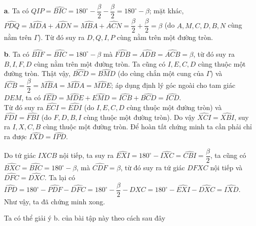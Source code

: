 \begin{ex}
{\noindent \textbf{a}. Ta có $\widehat{QIP}=\widehat{BIC}=180^\circ-\dfrac{\beta}{2}-\dfrac{\beta}{2}=180^\circ-\beta$; mặt khác, $\widehat{PDQ}=\widehat{MDA}+\widehat{ADN}=\widehat{MBA}+\widehat{ACN}=\dfrac{\beta}{2}+\dfrac{\beta}{2}=\beta$ (do $A,M,C,D,B,N$ cùng nằm trên $\Gamma$). Từ đó suy ra $D,Q,I,P$ cùng nằm trên một đường tròn.	
\begin{center}
\end{center}
\noindent\textbf{b}. Ta có $\widehat{BIF}=\widehat{BIC}=180^\circ-\beta$ mà $\widehat{FDB}=\widehat{ADB}=\widehat{ACB}=\beta$, từ đó suy ra $B,I,F,D$ cùng nằm trên một đường tròn. Ta cũng có $I,E,C,D$ cùng thuộc một đường tròn. Thật vậy, $\widehat{BCD}=\widehat{BMD}$ (do cùng chắn một cung của $\Gamma$) và $\widehat{ICB}=\dfrac{\beta}{2}=\widehat{MBA}=\widehat{MDA}=\widehat{MDE}$; áp dụng định lý góc ngoài cho tam giác $DEM$, ta có $\widehat{IED}=\widehat{MDE}+\widehat{EMD}=\widehat{ICB}+\widehat{BCD}=\widehat{ICD}$.\\
Từ đó suy ra $\widehat{ECI}=\widehat{EDI}$ (do $I,E,C,D$ cùng thuộc một đường tròn) và $\widehat{FDI}=\widehat{FBI}$ (do $F,D,B,I$ cùng thuộc một đường tròn). Do vậy $\widehat{XCI}=\widehat{XBI}$, suy ra $I,X,C,B$ cùng thuộc một đường tròn. Để hoàn tất chứng minh ta cần phải chỉ ra được $\widehat{IXD}=\widehat{IPD}$. 

Do tứ giác $IXCB$ nội tiếp, ta suy ra $\widehat{EXI}=180^\circ -\widehat{IXC}=\widehat{CBI}=\dfrac{\beta}{2}$, ta cũng có $\widehat{BXC}=\widehat{BIC}=180^\circ-\beta$, mà $\widehat{CDF}=\beta$, từ đó suy ra tứ giác $DFXC$ nội tiếp và $\widehat{DFC}=\widehat{DXC}$. Ta lại có $\widehat{IPD}=180^\circ-\widehat{PDF}-\widehat{DFC}=180^\circ-\dfrac{\beta}{2}-\widehat{DXC}=180^\circ-\widehat{EXI}-\widehat{DXC}=\widehat{IXD}$. Như vậy, ta đã chứng minh xong.
\begin{nx}
	Ta có thể giải ý b. của bài tập này theo cách sau đây
	

\end{nx}}
\end{ex}
